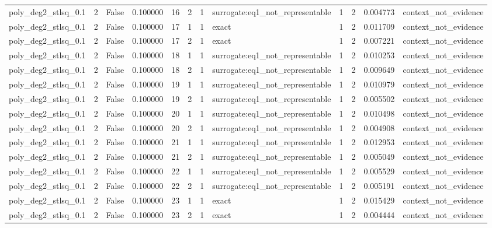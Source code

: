 \begin{tabular}{lrrrrrrlrrrl}
poly\_deg2\_stlsq\_0.1 & 2 & False & 0.100000 & 16 & 2 & 1 & surrogate:eq1\_not\_representable & 1 & 2 & 0.004773 & context\_not\_evidence \\
poly\_deg2\_stlsq\_0.1 & 2 & False & 0.100000 & 17 & 1 & 1 & exact & 1 & 2 & 0.011709 & context\_not\_evidence \\
poly\_deg2\_stlsq\_0.1 & 2 & False & 0.100000 & 17 & 2 & 1 & exact & 1 & 2 & 0.007221 & context\_not\_evidence \\
poly\_deg2\_stlsq\_0.1 & 2 & False & 0.100000 & 18 & 1 & 1 & surrogate:eq1\_not\_representable & 1 & 2 & 0.010253 & context\_not\_evidence \\
poly\_deg2\_stlsq\_0.1 & 2 & False & 0.100000 & 18 & 2 & 1 & surrogate:eq1\_not\_representable & 1 & 2 & 0.009649 & context\_not\_evidence \\
poly\_deg2\_stlsq\_0.1 & 2 & False & 0.100000 & 19 & 1 & 1 & surrogate:eq1\_not\_representable & 1 & 2 & 0.010979 & context\_not\_evidence \\
poly\_deg2\_stlsq\_0.1 & 2 & False & 0.100000 & 19 & 2 & 1 & surrogate:eq1\_not\_representable & 1 & 2 & 0.005502 & context\_not\_evidence \\
poly\_deg2\_stlsq\_0.1 & 2 & False & 0.100000 & 20 & 1 & 1 & surrogate:eq1\_not\_representable & 1 & 2 & 0.010498 & context\_not\_evidence \\
poly\_deg2\_stlsq\_0.1 & 2 & False & 0.100000 & 20 & 2 & 1 & surrogate:eq1\_not\_representable & 1 & 2 & 0.004908 & context\_not\_evidence \\
poly\_deg2\_stlsq\_0.1 & 2 & False & 0.100000 & 21 & 1 & 1 & surrogate:eq1\_not\_representable & 1 & 2 & 0.012953 & context\_not\_evidence \\
poly\_deg2\_stlsq\_0.1 & 2 & False & 0.100000 & 21 & 2 & 1 & surrogate:eq1\_not\_representable & 1 & 2 & 0.005049 & context\_not\_evidence \\
poly\_deg2\_stlsq\_0.1 & 2 & False & 0.100000 & 22 & 1 & 1 & surrogate:eq1\_not\_representable & 1 & 2 & 0.005529 & context\_not\_evidence \\
poly\_deg2\_stlsq\_0.1 & 2 & False & 0.100000 & 22 & 2 & 1 & surrogate:eq1\_not\_representable & 1 & 2 & 0.005191 & context\_not\_evidence \\
poly\_deg2\_stlsq\_0.1 & 2 & False & 0.100000 & 23 & 1 & 1 & exact & 1 & 2 & 0.015429 & context\_not\_evidence \\
poly\_deg2\_stlsq\_0.1 & 2 & False & 0.100000 & 23 & 2 & 1 & exact & 1 & 2 & 0.004444 & context\_not\_evidence \\

\end{tabular}
